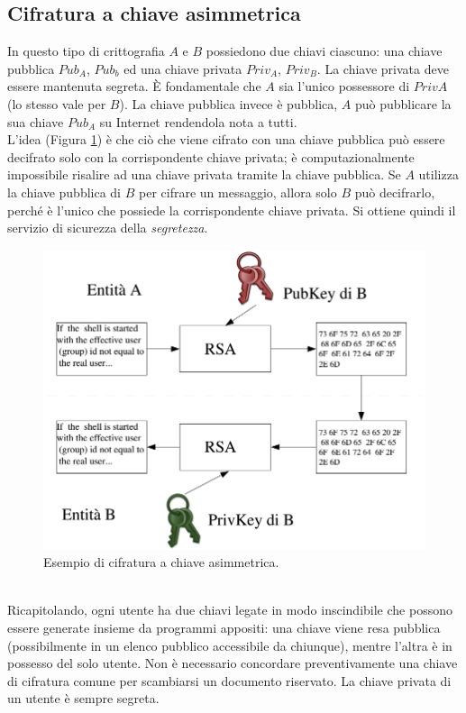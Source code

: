 \subsection{Cifratura a chiave asimmetrica}
In questo tipo di crittografia $A$ e $B$ possiedono due chiavi ciascuno: una chiave pubblica $Pub_A$, $Pub_b$ ed una chiave privata $Priv_A$, $Priv_B$. La chiave privata deve essere mantenuta segreta. È fondamentale che $A$ sia l'unico possessore di $PrivA$ (lo stesso vale per $B$). La chiave pubblica invece è pubblica, $A$ può pubblicare la sua chiave $Pub_A$ su Internet rendendola nota a tutti.\\
L'idea (Figura \ref{img:asymmetric_encryption}) è che ciò che viene cifrato con una chiave pubblica può essere decifrato solo con la corrispondente chiave privata; è computazionalmente impossibile risalire ad una chiave privata tramite la chiave pubblica. Se $A$ utilizza la chiave pubblica di $B$ per cifrare un messaggio, allora solo $B$ può decifrarlo, perché è l'unico che possiede la corrispondente chiave privata. Si ottiene quindi il servizio di sicurezza della \textit{segretezza}.
\begin{figure}[htbp]
	\centering
	\includegraphics[scale = 0.6]{images/asymmetric_encryption}
	\caption{Esempio di cifratura a chiave asimmetrica.}
	\label{img:asymmetric_encryption}
\end{figure}\\
Ricapitolando, ogni utente ha due chiavi legate in modo inscindibile che possono essere generate insieme da programmi appositi: una chiave viene resa pubblica (possibilmente in un elenco pubblico accessibile da chiunque), mentre l'altra è in possesso del solo utente. Non è necessario concordare preventivamente una chiave di cifratura comune per scambiarsi un documento riservato. La chiave privata di un utente è sempre segreta.

